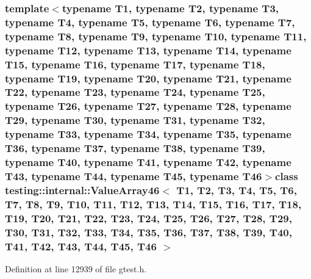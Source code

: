 \subsubsection*{template$<$typename T1, typename T2, typename T3, typename T4, typename T5, typename T6, typename T7, typename T8, typename T9, typename T10, typename T11, typename T12, typename T13, typename T14, typename T15, typename T16, typename T17, typename T18, typename T19, typename T20, typename T21, typename T22, typename T23, typename T24, typename T25, typename T26, typename T27, typename T28, typename T29, typename T30, typename T31, typename T32, typename T33, typename T34, typename T35, typename T36, typename T37, typename T38, typename T39, typename T40, typename T41, typename T42, typename T43, typename T44, typename T45, typename T46$>$class testing\-::internal\-::\-Value\-Array46$<$ T1, T2, T3, T4, T5, T6, T7, T8, T9, T10, T11, T12, T13, T14, T15, T16, T17, T18, T19, T20, T21, T22, T23, T24, T25, T26, T27, T28, T29, T30, T31, T32, T33, T34, T35, T36, T37, T38, T39, T40, T41, T42, T43, T44, T45, T46 $>$}



\-Definition at line 12939 of file gtest.\-h.



